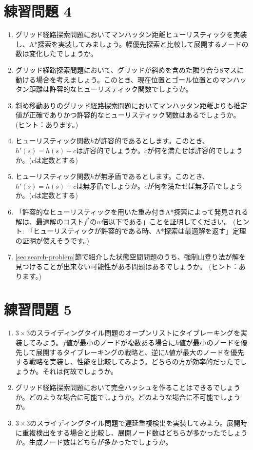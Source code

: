 \section{練習問題 4}

\begin{enumerate}
  \item グリッド経路探索問題においてマンハッタン距離ヒューリスティックを実装し、A*探索を実装してみましょう。幅優先探索と比較して展開するノードの数は変化したでしょうか。

  \item グリッド経路探索問題において、グリッドが斜めを含めた隣り合う8マスに動ける場合を考えましょう。このとき、現在位置とゴール位置とのマンハッタン距離は許容的なヒューリスティック関数でしょうか。
  
  \item 斜め移動ありのグリッド経路探索問題においてマンハッタン距離よりも推定値が正確でありかつ許容的なヒューリスティック関数はあるでしょうか。
  (ヒント：あります。)
  
  \item ヒューリスティック関数$h$が許容的であるとします。このとき、$h'(s) = h(s) + c$は許容的でしょうか。$c$が何を満たせば許容的でしょうか。($c$は定数とする)
  \item ヒューリスティック関数$h$が無矛盾であるとします。このとき、$h'(s) = h(s) + c$は無矛盾でしょうか。$c$が何を満たせば無矛盾でしょうか。($c$は定数とする)
  
  \item 「許容的なヒューリスティックを用いた重み付きA*探索によって発見される解は、最適解のコスト$f^*$の$w$倍以下である」ことを証明してください。
  (ヒント: 「ヒューリスティックが許容的である時、A*探索は最適解を返す」定理の証明が使えそうです。)
  
  \item \ref{sec:search-problem}節で紹介した状態空間問題のうち、強制山登り法が解を見つけることが出来ない可能性がある問題はあるでしょうか。
  (ヒント：あります。)
\end{enumerate}


\section{練習問題 5}
\begin{enumerate}
	\item $3 \times 3$のスライディングタイル問題のオープンリストにタイブレーキングを実装してみよう。$f$値が最小のノードが複数ある場合に$h$値が最小のノードを優先して展開するタイブレーキングの戦略と、逆に$h$値が最大のノードを優先する戦略を実装し、性能を比較してみよう。どちらの方が効率的だったでしょうか。それは何故でしょうか。
	
	\item グリッド経路探索問題において完全ハッシュを作ることはできるでしょうか。どのような場合に可能でしょうか。どのような場合に不可能でしょうか。

	\item $3 \times 3$のスライディングタイル問題で遅延重複検出を実装してみよう。展開時に重複検出をする場合と比較し、展開ノード数はどちらが多かったでしょうか。生成ノード数はどちらが多かったでしょうか。
\end{enumerate}


